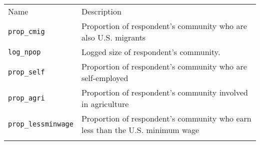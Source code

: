 \documentclass[]{article}
\begin{document}
\begin{longtable}[c]{@{}ll@{}}
\toprule\addlinespace
\begin{minipage}[b]{0.34\columnwidth}\raggedright
Name
\end{minipage} & \begin{minipage}[b]{0.59\columnwidth}\raggedright
Description
\end{minipage}
\\\addlinespace
\midrule\endhead
\begin{minipage}[t]{0.34\columnwidth}\raggedright
\texttt{prop\_cmig}
\end{minipage} & \begin{minipage}[t]{0.59\columnwidth}\raggedright
Proportion of respondent's community who are also U.S. migrants
\end{minipage}
\\\addlinespace
\begin{minipage}[t]{0.34\columnwidth}\raggedright
\texttt{log\_npop}
\end{minipage} & \begin{minipage}[t]{0.59\columnwidth}\raggedright
Logged size of respondent's community.
\end{minipage}
\\\addlinespace
\begin{minipage}[t]{0.34\columnwidth}\raggedright
\texttt{prop\_self}
\end{minipage} & \begin{minipage}[t]{0.59\columnwidth}\raggedright
Proportion of respondent's community who are self-employed
\end{minipage}
\\\addlinespace
\begin{minipage}[t]{0.34\columnwidth}\raggedright
\texttt{prop\_agri}
\end{minipage} & \begin{minipage}[t]{0.59\columnwidth}\raggedright
Proportion of respondent's community involved in agriculture
\end{minipage}
\\\addlinespace
\begin{minipage}[t]{0.34\columnwidth}\raggedright
\texttt{prop\_lessminwage}
\end{minipage} & \begin{minipage}[t]{0.59\columnwidth}\raggedright
Proportion of respondent's community who earn less than the U.S. minimum
wage
\end{minipage}
\\\addlinespace
\bottomrule
\end{longtable}
\end{document}
